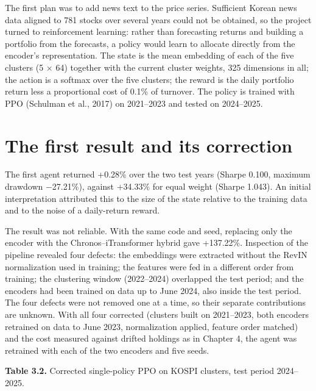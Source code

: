 \documentclass[12pt,a4paper]{report}
\begin{document}
The first plan was to add news text to the price series. Sufficient
Korean news data aligned to 781 stocks over several years could not be
obtained, so the project turned to reinforcement learning: rather than
forecasting returns and building a portfolio from the forecasts, a
policy would learn to allocate directly from the encoder's
representation. The state is the mean embedding of each of the five
clusters (5 × 64) together with the current cluster weights, 325
dimensions in all; the action is a softmax over the five clusters; the
reward is the daily portfolio return less a proportional cost of 0.1\%
of turnover. The policy is trained with PPO (Schulman et al., 2017) on
2021--2023 and tested on 2024--2025.

\section{The first result and its
correction}\label{the-first-result-and-its-correction}

The first agent returned +0.28\% over the two test years (Sharpe 0.100,
maximum drawdown −27.21\%), against +34.33\% for equal weight (Sharpe
1.043). An initial interpretation attributed this to the size of the
state relative to the training data and to the noise of a daily-return
reward.

The result was not reliable. With the same code and seed, replacing only
the encoder with the Chronos--iTransformer hybrid gave +137.22\%.
Inspection of the pipeline revealed four defects: the embeddings were
extracted without the RevIN normalization used in training; the features
were fed in a different order from training; the clustering window
(2022--2024) overlapped the test period; and the encoders had been
trained on data up to June 2024, also inside the test period. The four
defects were not removed one at a time, so their separate contributions
are unknown. With all four corrected (clusters built on 2021--2023, both
encoders retrained on data to June 2023, normalization applied, feature
order matched) and the cost measured against drifted holdings as in
Chapter 4, the agent was retrained with each of the two encoders and
five seeds.

\textbf{Table 3.2.} Corrected single-policy PPO on KOSPI clusters, test
period 2024--2025.
\end{document}
